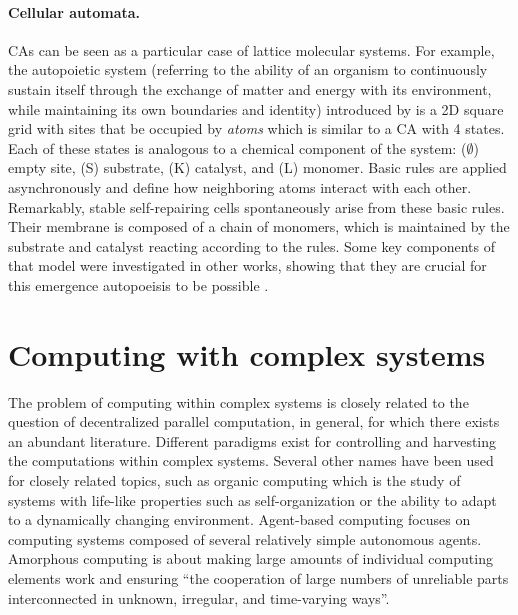 \paragraph{Cellular automata.}
\Acfp{CA} can be seen as a particular case of lattice molecular systems. For
example, the autopoietic system (referring to the ability of an organism to continuously 
sustain itself through the exchange of matter and energy with its environment, 
while maintaining its own boundaries and identity) introduced by
\textcite{varelaAutopoiesisOrganizationLiving1991} is a 2D square grid with
sites that be occupied by \emph{atoms} which is similar to a \ac{CA} with 4
states. Each of these states is analogous to a chemical component of the system:
($\emptyset$) empty site, (S) substrate, (K) catalyst, and (L) monomer. Basic rules are
applied asynchronously and define how neighboring atoms interact with each
other. Remarkably, stable self-repairing cells spontaneously arise from these
basic rules. Their membrane is composed of a chain of monomers, which is
maintained by the substrate and catalyst reacting according to the rules. Some
key components of that model were investigated in other works, showing that they
are crucial for this emergence autopoeisis to be possible
\parencite{zelenySelforganizationLivingSystems1977,
  mcmullinRediscoveringComputationalAutopoiesis1997}.

\section{Computing with complex systems}\label{sec:comp-with-compl}

The problem of computing within complex systems is closely related to the
question of decentralized parallel computation, in general, for which there exists
an abundant literature. Different paradigms exist for controlling and harvesting
the computations within complex systems. Several other names have been used for
closely related topics, such as organic computing
\parencite{muller-schloerOrganicComputingParadigm2011} which is the study of
systems with life-like properties such as self-organization or the ability to
adapt to a dynamically changing environment. Agent-based computing
\parencite{jenningsAgentBasedComputingPromise1999} focuses on computing systems
composed of several relatively simple autonomous agents. Amorphous computing
\parencite{abelsonAmorphousComputing2000,
  nagpalProgrammablePatternFormationScaleIndependence2008,
  nagpalProgrammableSelfassemblyUsing2002} is about making large amounts of
individual computing elements work and ensuring ``the cooperation of large
numbers of unreliable parts interconnected in unknown, irregular, and
time-varying ways''.

